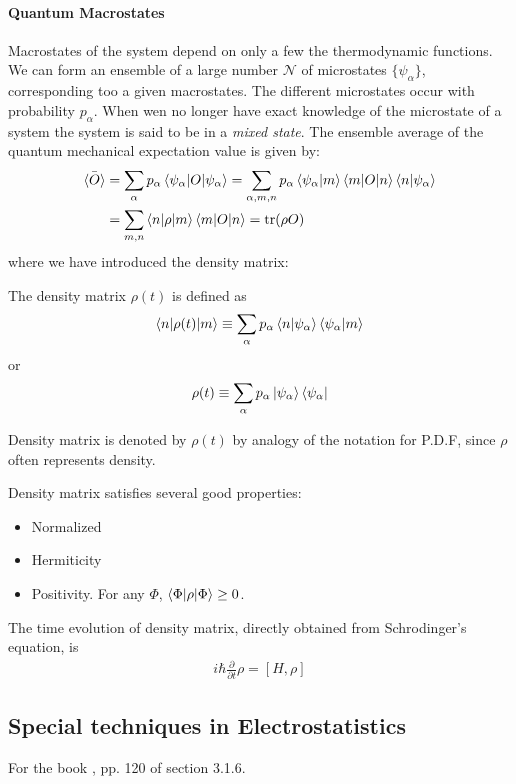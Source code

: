 \paragraph{Quantum Macrostates}
Macrostates of the system depend on only a few the thermodynamic
functions. We can form an ensemble of a large number $\mathcal{N}$ of
microstates $\{\psi_\alpha\}$, corresponding too a given macrostates.
The different microstates occur with probability $p_\alpha$.
When wen no longer have exact knowledge of the microstate of a
system the system is said to be in a \textit{mixed state}.
The ensemble average of the quantum mechanical expectation
value is given by:
\begin{align}
    \label{eq:quantum_macrostates_ensemble_avg}
    \bar{\braket{O}} &= 
        \sum_\alpha p_\alpha \braket{\psi_\alpha|O|\psi_\alpha}
        = \sum_{\alpha,m,n} p_\alpha
            \braket{\psi_\alpha|m}\braket{m|O|n}\braket{n|\psi_\alpha}
            \nonumber\\
        &= \sum_{m,n} \braket{n|\rho|m}\braket{m|O|n}
            = \text{tr}(\rho O)
\end{align}
where we have introduced the density matrix:
\begin{defi}
    The density matrix $\rho(t)$ is defined as
    \begin{align}
        \label{eq:density_matrix_def}
    \braket{n|\rho(t)|m} \equiv
    \sum_\alpha p_\alpha \braket{n|\psi_\alpha} \braket{\psi_\alpha|m}
    \end{align}
    or
    \begin{align}
        \label{eq:density_matrix_def_2}
        \rho(t) \equiv \sum_\alpha p_\alpha
            \ket{\psi_\alpha}\bra{\psi_\alpha}
    \end{align}
\end{defi}
Density matrix is denoted by $\rho(t)$ by analogy of the notation for
P.D.F, since $\rho$ often represents density.

Density matrix satisfies several good properties:
\begin{itemize}
    \item Normalized
    \item Hermiticity
    \item Positivity. For any $\Phi$, $\braket{\Phi|\rho|\Phi} \geq 0$.
\end{itemize}
The time evolution of density matrix, directly obtained from Schrodinger's
equation, is
\begin{align}
    \label{eq:quantum_macrostates:density_matrix:evolution}
    i\hbar \frac{\partial}{\partial t}\rho = [H,\rho]
\end{align}
\subsection{Special techniques in Electrostatistics}
\label{sec:Special-techniques-in-Electrostatistics}

For the book \cite{griffiths-EM}, pp. 120 of section 3.1.6. 
